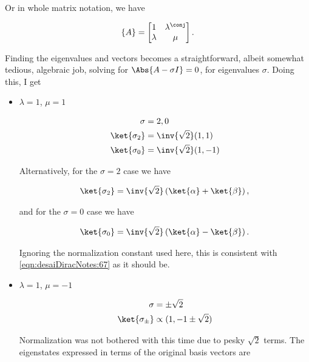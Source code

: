 Or in whole matrix notation, we have

\begin{align}\label{eqn:desaiDiracNotes:71}
\{ A \} = 
\begin{bmatrix}
1 & \lambda^\conj \\
\lambda & \mu
\end{bmatrix}.
\end{align}

Finding the eigenvalues and vectors becomes a straightforward, albeit somewhat tedious, algebraic job, solving for $\Abs{ A - \sigma I } = 0$, for eigenvalues $\sigma$.  Doing this, I get

\begin{itemize}
\item $\lambda = 1$, $\mu = 1$

\begin{align}\label{eqn:desaiDiracNotes:72}
\sigma &= 2,0 \\
\ket{\sigma_2} &= \inv{\sqrt{2}} (1,1) \\
\ket{\sigma_0} &= \inv{\sqrt{2}} (1,-1) 
\end{align}

Alternatively, for the $\sigma=2$ case we have

\begin{align}\label{eqn:desaiDiracNotes:72i}
\ket{\sigma_2} = \inv{\sqrt{2}}\left( \ket{\alpha} + \ket{\beta} \right),
\end{align}

and for the $\sigma=0$ case we have

\begin{align}\label{eqn:desaiDiracNotes:72ii}
\ket{\sigma_0} = \inv{\sqrt{2}}\left( \ket{\alpha} - \ket{\beta} \right).
\end{align}

Ignoring the normalization constant used here, this is consistent with \ref{eqn:desaiDiracNotes:67} as it should be.

\item $\lambda = 1$, $\mu = -1$

\begin{align}\label{eqn:desaiDiracNotes:73}
\sigma &= \pm \sqrt{2} \\
\ket{\sigma_{\pm}} &\propto (1,-1 \pm \sqrt{2}) 
\end{align}

Normalization was not bothered with this time due to pesky $\sqrt{2}$ terms.  The eigenstates expressed in terms of the original basis vectors are 


\end{itemize}
